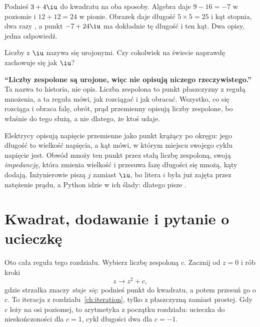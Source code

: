 


\noindent
Podnieś $3 + 4\iu$ do kwadratu na oba sposoby. Algebra daje $9 - 16 = -7$ w
poziomie i $12 + 12 = 24$ w pionie. Obrazek daje długość $5 \times 5 = 25$
i kąt  stopnia, dwa razy , a punkt
$-7 + 24\iu$ ma dokładnie tę długość i ten kąt. Dwa opisy, jedna
odpowiedź.

\begin{think}
Liczby z $\iu$ nazywa się urojonymi. Czy cokolwiek na świecie naprawdę
zachowuje się jak $\iu$?
\end{think}

\begin{trapbox}
\textbf{\enquote{Liczby zespolone są urojone, więc nie opisują niczego
rzeczywistego.}} Ta nazwa to historia, nie opis. Liczba zespolona to punkt
płaszczyzny z regułą mnożenia, a ta reguła mówi, jak rozciągać i jak
obracać. Wszystko, co się rozciąga i obraca \dash{} falę, obrót, prąd
przemienny \dash{} opisują liczby zespolone, bo właśnie do tego służą, a nie
dlatego, że ktoś udaje.
\end{trapbox}

\begin{worldbox}
Elektrycy opisują napięcie przemienne jako punkt krążący po okręgu: jego
długość to wielkość napięcia, a kąt mówi, w którym miejscu swojego cyklu
napięcie jest. Obwód mnoży ten punkt przez stałą liczbę zespoloną, swoją
\emph{impedancję}, która zmienia wielkość i przesuwa fazę \dash{} długości
się mnożą, kąty dodają. Inżynierowie piszą $j$ zamiast $\iu$, bo litera $i$
była już zajęta przez natężenie prądu, a Python idzie w ich ślady: dlatego
pisze .
\end{worldbox}

\section{Kwadrat, dodawanie i pytanie o ucieczkę}
\label{sec:ch12-escape}

\noindent
Oto cała reguła tego rozdziału. Wybierz liczbę zespoloną $c$. Zacznij od
$z = 0$ i rób kroki
\[ z \to z^{2} + c , \]
gdzie strzałka znaczy \emph{staje się}: podnieś punkt do kwadratu, a potem
przesuń go o $c$. To iteracja z rozdziału~\ref{ch:iteration}, tylko z
płaszczyzną zamiast prostej. Gdy $c$ leży na osi poziomej, to arytmetyka z
początku rozdziału: ucieczka do nieskończoności dla $c = 1$, cykl długości
dwa dla $c = -1$.


